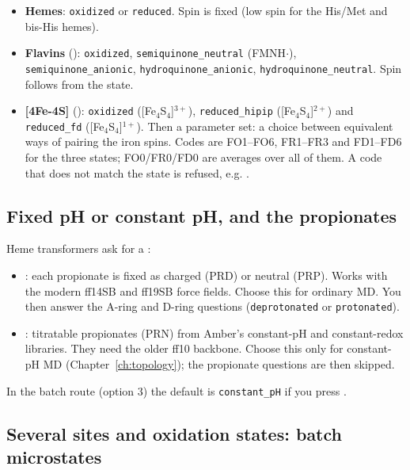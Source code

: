 \begin{itemize}\sloppy
  \item \textbf{Hemes}: \texttt{oxidized} or \texttt{reduced}. Spin is fixed
        (low spin for the His/Met and bis-His hemes).
  \item \textbf{Flavins} (): \texttt{oxidized},
        \texttt{semiquinone\_neutral} (FMNH$\cdot$),
        \texttt{semiquinone\_anionic}, \texttt{hydroquinone\_anionic},
        \texttt{hydroquinone\_neutral}. Spin follows from the state.
  \item \textbf{[4Fe-4S]} (): \texttt{oxidized} ([Fe$_4$S$_4$]$^{3+}$),
        \texttt{reduced\_hipip} ([Fe$_4$S$_4$]$^{2+}$) and
        \texttt{reduced\_fd} ([Fe$_4$S$_4$]$^{1+}$). Then a
         parameter set: a choice between equivalent
        ways of pairing the iron spins. Codes are FO1--FO6, FR1--FR3 and
        FD1--FD6 for the three states; FO0/FR0/FD0 are averages over all of
        them. A code that does not match the state is refused, e.g.
        .
\end{itemize}

\subsection{Fixed pH or constant pH, and the propionates}
\label{sec:redox-ph}

Heme transformers ask for a :

\begin{itemize}\sloppy
  \item {}: each propionate is fixed as charged (PRD) or neutral
        (PRP). Works with the modern ff14SB and ff19SB force fields. Choose
        this for ordinary MD. You then answer the A-ring and D-ring questions
        (\texttt{deprotonated} or \texttt{protonated}).
  \item {}: titratable propionates (PRN) from Amber's
        constant-pH and constant-redox libraries. They need the older ff10
        backbone. Choose this only for constant-pH MD
        (Chapter~\ref{ch:topology}); the propionate questions are then
        skipped.
\end{itemize}

In the batch route (option 3) the default is \texttt{constant\_pH} if you
press .

\subsection{Several sites and oxidation states: batch microstates}
\label{sec:redox-batch}

